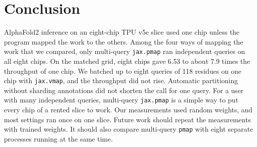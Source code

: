 \section{Conclusion}\label{sec:conclusion}
AlphaFold2 inference on an eight-chip TPU v5e slice used one chip unless the program mapped the work to the others.
Among the four ways of mapping the work that we compared, only multi-query \texttt{jax.pmap} ran independent queries on all eight chips.
On the matched grid, eight chips gave 6.53 to about 7.9 times the throughput of one chip. %
We batched up to eight queries of 118 residues on one chip with \texttt{jax.vmap}, and the throughput did not rise. %
Automatic partitioning without sharding annotations did not shorten the call for one query.
For a user with many independent queries, multi-query \texttt{jax.pmap} is a simple way to put every chip of a rented slice to work.
Our measurements used random weights, and most settings ran once on one slice. Future work should repeat the measurements with trained weights.
It should also compare multi-query \texttt{pmap} with eight separate processes running at the same time.

